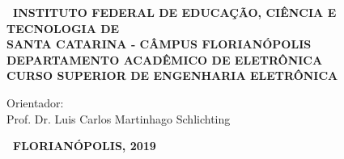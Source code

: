 \documentclass{ifscTCC} %
\begin{document}
\begin{capa}%
    \begin{SingleSpacing}
        \center
        \ABNTEXchapterfont\bfseries\ INSTITUTO FEDERAL DE EDUCAÇÃO, CIÊNCIA E TECNOLOGIA DE\\SANTA CATARINA - CÂMPUS FLORIANÓPOLIS\\DEPARTAMENTO ACADÊMICO DE ELETRÔNICA\\CURSO SUPERIOR DE ENGENHARIA ELETRÔNICA
        
        \vspace*{3.0cm}     %
        
        \ABNTEXchapterfont\bfseries\MakeUppercase\imprimirautor
        
        \vspace*{\fill} 
            \begin{center}
                \ABNTEXchapterfont\SingleSpacing\bfseries\Large\MakeUppercase\imprimirtitulo
            \end{center}
        \vspace*{\fill} 
        
        \hspace{.45\textwidth}
        \begin{minipage}{.5\textwidth}
            \begin{SingleSpacing}
                \normalfont\imprimirpreambulo
                \vspace*{1.0cm}
                
                Orientador:\\Prof. Dr. Luis Carlos Martinhago Schlichting
            \end{SingleSpacing}
        \end{minipage}%
        \vspace*{\fill} 
        
        \begin{center}
            \ABNTEXchapterfont\bfseries\ FLORIANÓPOLIS, 2019
        \end{center}
    \end{SingleSpacing}
\end{capa}
\end{document}
